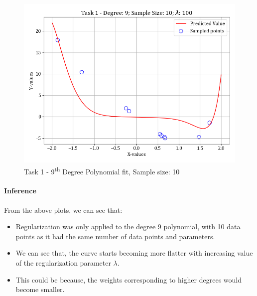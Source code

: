 \documentclass[12pt,a4paper]{article}
\begin{document}
\begin{figure}[H]
    \vspace{-2em}
    \centering
    \includegraphics[scale=0.45]{images/t1_d1/d_9_size_10_l_100.png}
    \caption{Task 1 - 9\textsuperscript{th} Degree Polynomial fit, Sample size: 10}
\end{figure}

\paragraph{Inference}
From the above plots, we can see that:
\begin{itemize}
    \itemsep0em
    \item Regularization was only applied to the degree 9 polynomial, with 10 data points as it had the same number of data points and parameters. 
    \item We can see that, the curve starts becoming more flatter with increasing value of the  regularization parameter $\lambda$.
    \item This could be because, the weights corresponding to higher degrees would become smaller.
\end{itemize}
\end{document}
